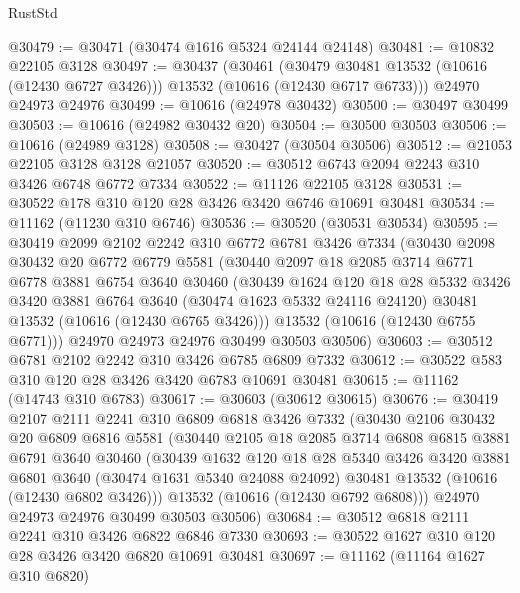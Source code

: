 \begin{lexlean}{RustStd}
\begin{coremodule}
@30479 := @30471 (@30474 @1616 @5324 @24144 @24148)
@30481 := @10832 @22105 @3128
@30497 := @30437
    (@30461
      (@30479 @30481 @13532 (@10616 (@12430 @6727 @3426)))
      @13532
      (@10616 (@12430 @6717 @6733)))
    @24970
    @24973
    @24976
@30499 := @10616 (@24978 @30432)
@30500 := @30497 @30499
@30503 := @10616 (@24982 @30432 @20)
@30504 := @30500 @30503
@30506 := @10616 (@24989 @3128)
@30508 := @30427 (@30504 @30506)
@30512 := @21053 @22105 @3128 @3128 @21057
@30520 := @30512 @6743 @2094 @2243 @310 @3426 @6748 @6772 @7334
@30522 := @11126 @22105 @3128
@30531 := @30522 @178 @310 @120 @28 @3426 @3420 @6746 @10691 @30481
@30534 := @11162 (@11230 @310 @6746)
@30536 := @30520 (@30531 @30534)
@30595 := @30419
    @2099
    @2102
    @2242
    @310
    @6772
    @6781
    @3426
    @7334
    (@30430
      @2098
      @30432
      @20
      @6772
      @6779
      @5581
      (@30440
        @2097
        @18
        @2085
        @3714
        @6771
        @6778
        @3881
        @6754
        @3640
        @30460
        (@30439
          @1624
          @120
          @18
          @28
          @5332
          @3426
          @3420
          @3881
          @6764
          @3640
          (@30474 @1623 @5332 @24116 @24120)
          @30481
          @13532
          (@10616 (@12430 @6765 @3426)))
        @13532
        (@10616 (@12430 @6755 @6771)))
      @24970
      @24973
      @24976
      @30499
      @30503
      @30506)
@30603 := @30512 @6781 @2102 @2242 @310 @3426 @6785 @6809 @7332
@30612 := @30522 @583 @310 @120 @28 @3426 @3420 @6783 @10691 @30481
@30615 := @11162 (@14743 @310 @6783)
@30617 := @30603 (@30612 @30615)
@30676 := @30419
    @2107
    @2111
    @2241
    @310
    @6809
    @6818
    @3426
    @7332
    (@30430
      @2106
      @30432
      @20
      @6809
      @6816
      @5581
      (@30440
        @2105
        @18
        @2085
        @3714
        @6808
        @6815
        @3881
        @6791
        @3640
        @30460
        (@30439
          @1632
          @120
          @18
          @28
          @5340
          @3426
          @3420
          @3881
          @6801
          @3640
          (@30474 @1631 @5340 @24088 @24092)
          @30481
          @13532
          (@10616 (@12430 @6802 @3426)))
        @13532
        (@10616 (@12430 @6792 @6808)))
      @24970
      @24973
      @24976
      @30499
      @30503
      @30506)
@30684 := @30512 @6818 @2111 @2241 @310 @3426 @6822 @6846 @7330
@30693 := @30522 @1627 @310 @120 @28 @3426 @3420 @6820 @10691 @30481
@30697 := @11162 (@11164 @1627 @310 @6820)

\end{coremodule}
\end{lexlean}
